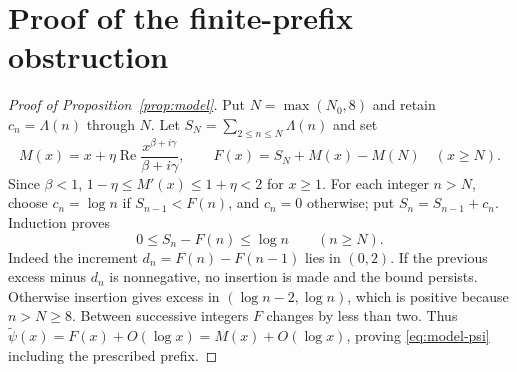 \documentclass[11pt]{article}
\theoremstyle{remark}
\newcommand{\Rea}{\operatorname{Re}}
\numberwithin{equation}{section}
\begin{document}
\section{Proof of the finite-prefix obstruction}\label{app:model}
\begin{proof}[Proof of Proposition~\ref{prop:model}]
Put $N=\max(N_0,8)$ and retain $c_n=\Lambda(n)$ through $N$.
Let $S_N=\sum_{2\le n\le N}\Lambda(n)$ and set
\[
M(x)=x+\eta\Rea\frac{x^{\beta+i\gamma}}{\beta+i\gamma},\qquad
F(x)=S_N+M(x)-M(N)\quad(x\ge N).
\]
Since $\beta<1$, $1-\eta\le M'(x)\le1+\eta<2$ for $x\ge1$.
For each integer $n>N$, choose $c_n=\log n$ if $S_{n-1}<F(n)$,
and $c_n=0$ otherwise; put $S_n=S_{n-1}+c_n$.
Induction proves
\begin{equation}\label{eq:tracking}
0\le S_n-F(n)\le\log n\qquad(n\ge N).
\end{equation}
Indeed the increment $d_n=F(n)-F(n-1)$ lies in $(0,2)$. If the previous
excess minus $d_n$ is nonnegative, no insertion is made and the bound
persists. Otherwise insertion gives excess in $(\log n-2,\log n)$,
which is positive because $n>N\ge8$. Between successive integers
$F$ changes by less than two. Thus
$\widetilde\psi(x)=F(x)+O(\log x)=M(x)+O(\log x)$, proving
\eqref{eq:model-psi} including the prescribed prefix.


\end{proof}
\end{document}
